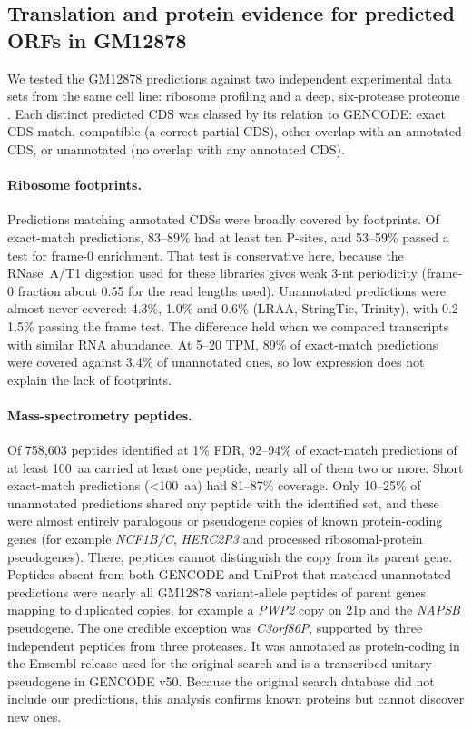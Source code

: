 \subsection{Translation and protein evidence for predicted ORFs in GM12878}

We tested the GM12878 predictions against two independent experimental data sets from the same cell
line: ribosome profiling \citep{Cenik2015} and a deep, six-protease proteome \citep{Sinitcyn2023}.
Each distinct predicted CDS was classed by its relation to GENCODE: exact CDS match, compatible
(a correct partial CDS), other overlap with an annotated CDS, or unannotated (no overlap with any
annotated CDS).

\paragraph{Ribosome footprints.}
Predictions matching annotated CDSs were broadly covered by footprints. Of exact-match predictions,
83--89\% had at least ten P-sites, and 53--59\% passed a test for frame-0 enrichment. That test is
conservative here, because the RNase~A/T1 digestion used for these libraries gives weak 3-nt
periodicity (frame-0 fraction about 0.55 for the read lengths used). Unannotated predictions were
almost never covered: 4.3\%, 1.0\% and 0.6\% (LRAA, StringTie, Trinity), with 0.2--1.5\% passing
the frame test. The difference held when we compared transcripts with similar RNA abundance. At
5--20 TPM, 89\% of exact-match predictions were covered against 3.4\% of unannotated ones, so low
expression does not explain the lack of footprints.

\paragraph{Mass-spectrometry peptides.}
Of 758,603 peptides identified at 1\% FDR, 92--94\% of exact-match predictions of at least 100~aa
carried at least one peptide, nearly all of them two or more. Short exact-match predictions
(\textless100~aa) had 81--87\% coverage. Only 10--25\% of unannotated predictions shared any
peptide with the identified set, and these were almost entirely paralogous or pseudogene copies of
known protein-coding genes (for example \textit{NCF1B/C}, \textit{HERC2P3} and processed
ribosomal-protein pseudogenes). There, peptides cannot distinguish the copy from its parent gene.
Peptides absent from both GENCODE and UniProt that matched unannotated predictions were nearly all
GM12878 variant-allele peptides of parent genes mapping to duplicated copies, for example a
\textit{PWP2} copy on 21p and the \textit{NAPSB} pseudogene. The one credible exception was
\textit{C3orf86P}, supported by three independent peptides from three proteases. It was annotated
as protein-coding in the Ensembl release used for the original search and is a transcribed unitary
pseudogene in GENCODE v50. Because the original search database did not include our predictions,
this analysis confirms known proteins but cannot discover new ones.

